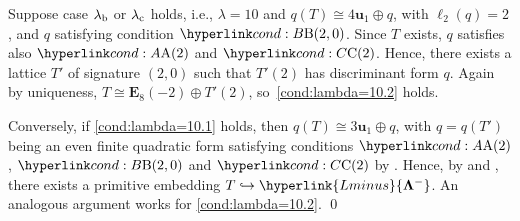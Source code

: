\documentclass[a4paper]{amsart}
\theoremstyle{definition}
\theoremstyle{plain}
\newcommand{\bE}{\mathbf{E}}
\newcommand{\bU}{\mathbf{U}}
\newcommand{\bu}{\mathbf{u}}
\newcommand{\bLambda}{\mathbf{\Lambda}}
\newcommand{\Lminus}{\hyperlink{Lminus}{\bLambda^-}}
\newcommand{\Etilde}{\hyperlink{tildeE}{\mathbf{\tilde{E}}}}
\begin{document}
Suppose case \(\lambda_{\rm b}\) or \(\lambda_{\rm c}\) holds, i.e., \(\lambda = 10\) and \(q(T) \cong 4\bu_1 \oplus q\), with \(\ell_2(q) = 2\), and \(q\) satisfying condition \(\condB{2, 0}\).
Since \(T\) exists, \(q\) satisfies also \(\condA{2}\) and \(\condC{2}\). 
Hence, there exists a lattice \(T'\) of signature \((2,0)\) such that \(T'(2)\) has discriminant form \(q\). 
Again by uniqueness, \(T \cong \bE_8(-2) \oplus T'(2)\), so~\ref{cond:lambda=10.2} holds.

Conversely, if \ref{cond:lambda=10.1} holds, then \(q(T) \cong 3\bu_1 \oplus q\), with \(q = q(T')\) being an even finite quadratic form satisfying conditions \(\condA{2}\), \(\condB{2,0}\) and \(\condC{2}\) by . 
Hence, by  and , there exists a primitive embedding \(T \hookrightarrow \Lminus\). 
An analogous argument works for \ref{cond:lambda=10.2}. \qed
\end{document}
